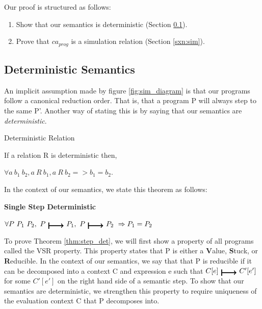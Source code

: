 Our proof is structured as follows:
\begin{enumerate}
    \item Show that our semantics is deterministic (Section \ref{sxn:det_sem}).
    \item Prove that $ca_{prog}$ is a simulation relation (Section \ref{sxn:sim}).
\end{enumerate}


\subsection{Deterministic Semantics}\label{sxn:det_sem}
An implicit assumption made by figure \ref{fig:sim_diagram} is that our programs follow a canonical reduction order. That is, that a program P will always step to the same P'. Another way of stating this is by saying that our semantics are \textit{deterministic}.

\begin{definition} Deterministic Relation

If a relation R is deterministic then,

$\forall a\ b_1\ b_2, a\ R\ b_1, a\ R\ b_2 => b_1 = b_2$.

\end{definition}

In the context of our semantics, we state this theorem as follows:

\begin{theorem}\label{thm:step_det}


\textbf{Single Step Deterministic}

$\forall P\ P_1\ P_2,\ P\ \step\ P_1,\ P\ \step\ P_2\ => P_1 = P_2$


\end{theorem}

To prove Theorem \ref{thm:step_det}, we will first show a property of all programs called the VSR property. This property states that P is either a \textbf{V}alue, \textbf{S}tuck, or \textbf{R}educible. In the context of our semantics, we say that that P is reducible if it can be decomposed into a context C and expression e such that $C[e]\ \step\ C'[e']$ for some $C'[e']$ on the right hand side of a semantic step. To show that our semantics are deterministic, we strengthen this property to require uniqueness of the evaluation context C that P decomposes into.

